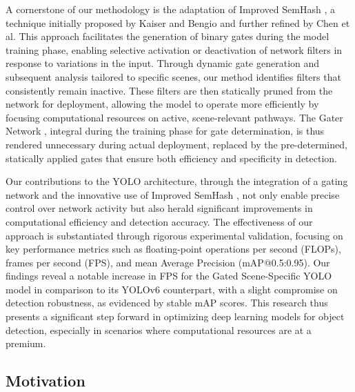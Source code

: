 A cornerstone of our methodology is the adaptation of Improved SemHash \cite*{kaiser2018discrete}, a technique initially proposed by Kaiser and Bengio and further refined by Chen et al. \cite*{chen2019you} This approach facilitates the generation of binary gates during the model training phase, enabling selective activation or deactivation of network filters in response to variations in the input. Through dynamic gate generation and subsequent analysis tailored to specific scenes, our method identifies filters that consistently remain inactive. These filters are then statically pruned from the network for deployment, allowing the model to operate more efficiently by focusing computational resources on active, scene-relevant pathways. The Gater Network \cite*{chen2019you}, integral during the training phase for gate determination, is thus rendered unnecessary during actual deployment, replaced by the pre-determined, statically applied gates that ensure both efficiency and specificity in detection.

Our contributions to the YOLO architecture, through the integration of a gating network and the innovative use of Improved SemHash \cite*{kaiser2018discrete}, not only enable precise control over network activity but also herald significant improvements in computational efficiency and detection accuracy. The effectiveness of our approach is substantiated through rigorous experimental validation, focusing on key performance metrics such as floating-point operations per second (FLOPs), frames per second (FPS), and mean Average Precision (mAP@0.5:0.95). Our findings reveal a notable increase in FPS for the Gated Scene-Specific YOLO model in comparison to its YOLOv6 counterpart, with a slight compromise on detection robustness, as evidenced by stable mAP scores. This research thus presents a significant step forward in optimizing deep learning models for object detection, especially in scenarios where computational resources are at a premium.




\subsection{Motivation}


